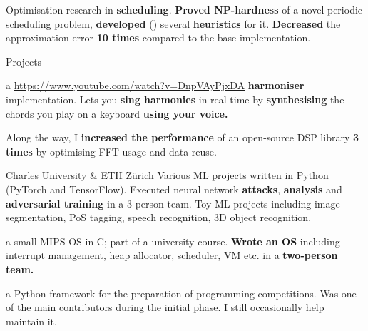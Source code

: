 %
%
\: Optimisation research in {\bf scheduling}.
\: {\bf Proved NP-hardness} of a novel periodic scheduling problem, {\bf
developed} (\Cpp) several {\bf heuristics} for it.
\:
{\bf Decreased} the approximation error {\bf 10 times} compared to the base implementation.

\endlist

\sekce Projects

%
a \Cpp{} \url{https://www.youtube.com/watch?v=DnpVAyPjxDA}{{\bf
harmoniser}} implementation.
\: Lets you {\bf sing harmonies} in real time by {\bf synthesising} the
chords you play on a keyboard {\bf using your voice.}

\: Along the way, I {\bf increased the performance} of an
open-source DSP library {\bf 3 times} by optimising FFT usage and data reuse.

\endlist

 Charles University \& ETH Zürich
%
\: Various ML projects written in Python (PyTorch and TensorFlow).
\: Executed neural network {\bf attacks}, {\bf analysis} and {\bf adversarial training} in a 3-person team.
\: Toy ML projects including image segmentation, PoS tagging, speech recognition, 3D object recognition.
\endlist


 a small MIPS OS in C; part of a university course.
%
\: {\bf Wrote an OS} including interrupt management, heap allocator,
scheduler, VM etc. in a {\bf two-person team.}
\endlist

 a Python framework for the preparation of programming competitions.
%
\: Was one of the main contributors during the initial phase. I still occasionally help maintain it.
\endlist


%
%


